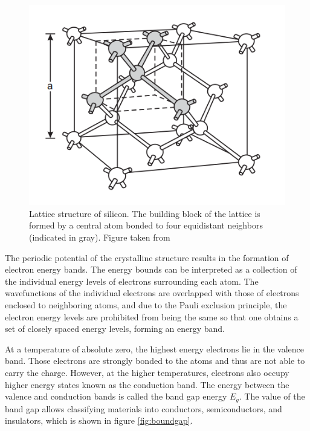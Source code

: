 \begin{figure}[h]
\centering
\includegraphics{figures/silicon.PNG}
\caption{Lattice structure of silicon. The building block of the lattice is formed by a central atom bonded to four
equidistant neighbors (indicated in gray). Figure taken from \cite{semiconductors_det_sys}}
\label{fig:silicon}
\end{figure}


The periodic potential of the crystalline structure results in the formation of electron energy bands. The energy bounds can be interpreted as a collection of the individual energy levels of electrons surrounding each atom. The wavefunctions of the individual electrons are overlapped with those of electrons enclosed to neighboring atoms, and due to the Pauli exclusion principle, the electron energy levels are prohibited from being the same so that one obtains a set of closely spaced energy levels, forming an energy band. 

At a temperature of absolute zero, the highest energy electrons lie in the valence band. Those electrons are strongly bonded to the atoms and thus are not able to carry the charge.  However, at the higher temperatures, electrons also occupy higher energy states known as the conduction band. The energy between the valence and conduction bands is called the band gap energy $E_g$.  The value of the band gap allows classifying materials into conductors, semiconductors, and insulators, which is shown in figure \ref{fig:boundgap}. 


